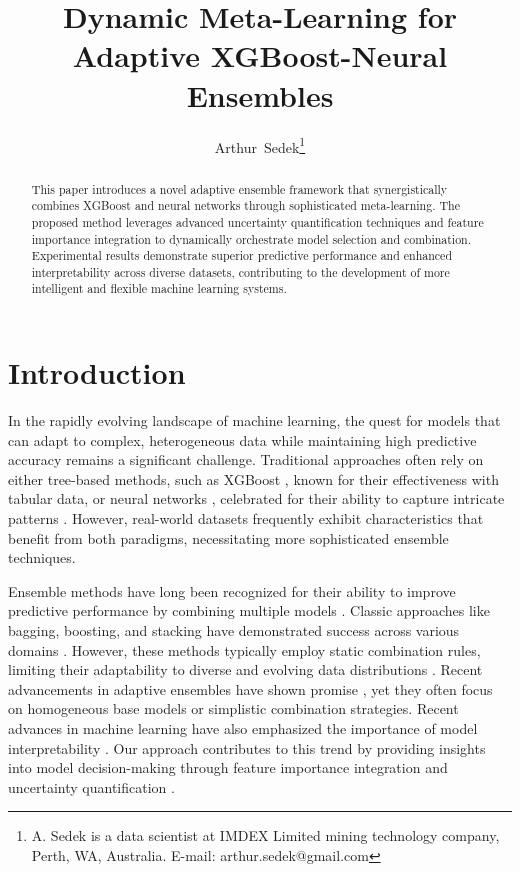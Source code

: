 \documentclass[10pt,journal,compsoc]{IEEEtran}
\begin{document}
\title{Dynamic Meta-Learning for Adaptive XGBoost-Neural Ensembles}

\author{Arthur~Sedek\thanks{A. Sedek is a data scientist at IMDEX Limited mining technology company, Perth, WA, Australia. 
E-mail: arthur.sedek@gmail.com}}

\maketitle

\begin{abstract}
This paper introduces a novel adaptive ensemble framework that synergistically combines XGBoost and neural networks through sophisticated meta-learning. The proposed method leverages advanced uncertainty quantification techniques and feature importance integration to dynamically orchestrate model selection and combination. Experimental results demonstrate superior predictive performance and enhanced interpretability across diverse datasets, contributing to the development of more intelligent and flexible machine learning systems.
\end{abstract}

\section{Introduction}


In the rapidly evolving landscape of machine learning, the quest for models that can adapt to complex, heterogeneous data while maintaining high predictive accuracy remains a significant challenge. Traditional approaches often rely on either tree-based methods, such as XGBoost \cite{chen2016xgboost}, known for their effectiveness with tabular data, or neural networks \cite{lecun2015deep,schmidhuber2015deep}, celebrated for their ability to capture intricate patterns \cite{bishop2006pattern}. However, real-world datasets frequently exhibit characteristics that benefit from both paradigms, necessitating more sophisticated ensemble techniques.

Ensemble methods have long been recognized for their ability to improve predictive performance by combining multiple models \cite{dietterich2000ensemble,caruana2004ensemble,liu2009survey}. Classic approaches like bagging, boosting, and stacking have demonstrated success across various domains \cite{breiman2001random,ho1998random,wolpert1992stacked}. However, these methods typically employ static combination rules, limiting their adaptability to diverse and evolving data distributions \cite{hastie2009ensemble}. Recent advancements in adaptive ensembles have shown promise \cite{cruz2018dynamic}, yet they often focus on homogeneous base models or simplistic combination strategies. Recent advances in machine learning have also emphasized the importance of model interpretability \cite{molnar2019interpretable}. Our approach contributes to this trend by providing insights into model decision-making through feature importance integration and uncertainty quantification \cite{lundberg2017unified,yosinski2014understanding}.
\end{document}
